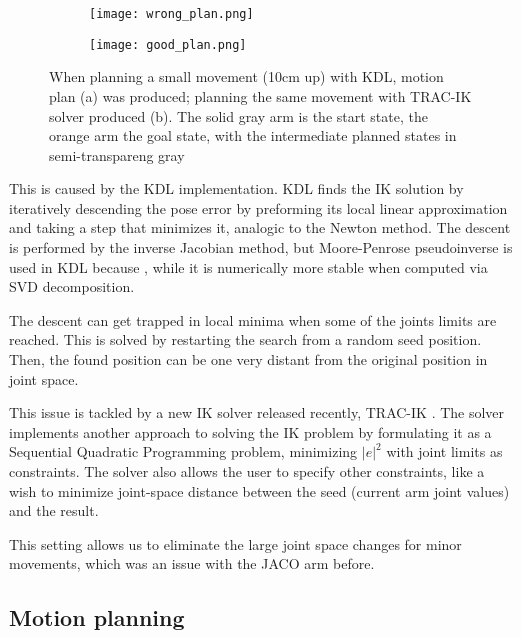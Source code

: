 \documentclass[buriama8_dp.tex]{subfiles}
\begin{document}
\begin{figure}[htp]
  \centering
  \begin{subfigure}[t]{0.49\textwidth}
    \texttt{[image: wrong\_plan.png]}
    \caption{}
    \label{fig:wron_plan}
  \end{subfigure}
  \begin{subfigure}[t]{0.49\textwidth}
    \texttt{[image: good\_plan.png]}
    \caption{}
    \label{fig:wrong_joint}
  \end{subfigure}

  \caption{When planning a small movement (10cm up) with KDL, motion plan (a) was produced; planning the same movement with TRAC-IK solver produced (b). The solid gray arm is the start state, the orange arm the goal state, with the intermediate planned states in semi-transpareng gray}
  \label{fig:wrong_planning}
\end{figure}

This is caused by the KDL implementation. KDL finds the IK solution by iteratively descending the pose error by preforming its local linear approximation\cite{tracik}  and taking a step that minimizes it, analogic to the Newton method. The descent is performed by the inverse Jacobian method, but Moore-Penrose pseudoinverse is used in KDL because , while it is numerically more stable when computed via SVD decomposition.

The descent can get trapped in local minima when some of the joints limits are reached. This is solved by restarting the search from a random seed position. Then, the found position can be one very distant from the original position in joint space.

This issue is tackled by a new IK solver released recently, TRAC-IK \cite{tracik}. The solver implements another approach to solving the IK problem by formulating it as a Sequential Quadratic Programming problem, minimizing \(|e|^2\) with joint limits as constraints. The solver also allows the user to specify other constraints, like a wish to minimize joint-space distance between the seed (current arm joint values) and the result.

This setting allows us to eliminate the large joint space changes for minor movements, which was an issue with the JACO arm before. 

\subsection{Motion planning}
\label{subsec:motion_planning}
\end{document}
